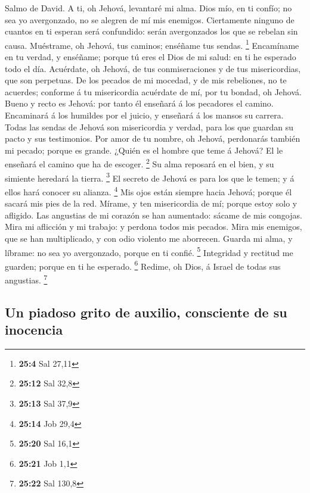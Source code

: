  Salmo de David. A ti, oh Jehová, levantaré mi alma.
 Dios mío, en ti confío; no sea yo avergonzado, no se
alegren de mí mis enemigos.  Ciertamente ninguno de cuantos
en ti esperan será confundido: serán avergonzados los que se rebelan sin
causa.  Muéstrame, oh Jehová, tus caminos; enséñame tus
sendas. \footnote{\textbf{25:4} Sal 27,11}  Encamíname en tu
verdad, y enséñame; porque tú eres el Dios de mi salud: en ti he
esperado todo el día.  Acuérdate, oh Jehová, de tus
conmiseraciones y de tus misericordias, que son perpetuas. 
De los pecados de mi mocedad, y de mis rebeliones, no te acuerdes;
conforme á tu misericordia acuérdate de mí, por tu bondad, oh Jehová.
 Bueno y recto es Jehová: por tanto él enseñará á los
pecadores el camino.  Encaminará á los humildes por el
juicio, y enseñará á los mansos su carrera.  Todas las
sendas de Jehová son misericordia y verdad, para los que guardan su
pacto y sus testimonios.  Por amor de tu nombre, oh Jehová,
perdonarás también mi pecado; porque es grande.  ¿Quién es
el hombre que teme á Jehová? El le enseñará el camino que ha de escoger.
\footnote{\textbf{25:12} Sal 32,8}  Su alma reposará en el
bien, y su simiente heredará la tierra. \footnote{\textbf{25:13} Sal
  37,9}  El secreto de Jehová es para los que le temen; y á
ellos hará conocer su alianza. \footnote{\textbf{25:14} Job 29,4}
 Mis ojos están siempre hacia Jehová; porque él sacará mis
pies de la red.  Mírame, y ten misericordia de mí; porque
estoy solo y afligido.  Las angustias de mi corazón se han
aumentado: sácame de mis congojas.  Mira mi aflicción y mi
trabajo: y perdona todos mis pecados.  Mira mis enemigos,
que se han multiplicado, y con odio violento me aborrecen. 
Guarda mi alma, y líbrame: no sea yo avergonzado, porque en ti confié.
\footnote{\textbf{25:20} Sal 16,1}  Integridad y rectitud
me guarden; porque en ti he esperado. \footnote{\textbf{25:21} Job 1,1}
 Redime, oh Dios, á Israel de todas sus angustias.
\footnote{\textbf{25:22} Sal 130,8}

\hypertarget{un-piadoso-grito-de-auxilio-consciente-de-su-inocencia}{%
\subsection{Un piadoso grito de auxilio, consciente de su
inocencia}\label{un-piadoso-grito-de-auxilio-consciente-de-su-inocencia}}

